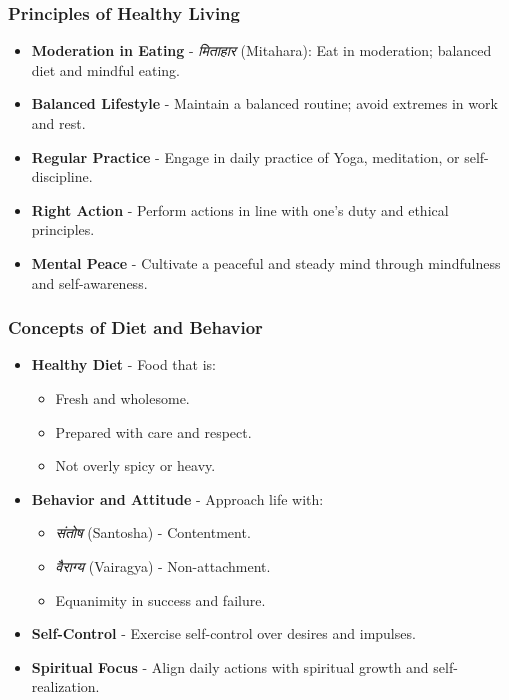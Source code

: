 \begin{frame}[fragile]\frametitle{Principles of Healthy Living}

      \begin{itemize}
		\item \textbf{Moderation in Eating} - \textit{मिताहार} (Mitahara): Eat in moderation; balanced diet and mindful eating.
		\item \textbf{Balanced Lifestyle} - Maintain a balanced routine; avoid extremes in work and rest.
		\item \textbf{Regular Practice} - Engage in daily practice of Yoga, meditation, or self-discipline.
		\item \textbf{Right Action} - Perform actions in line with one’s duty and ethical principles.
		\item \textbf{Mental Peace} - Cultivate a peaceful and steady mind through mindfulness and self-awareness.
	  \end{itemize}

\end{frame}

\begin{frame}[fragile]\frametitle{Concepts of Diet and Behavior}

      \begin{itemize}
		\item \textbf{Healthy Diet} - Food that is:
		  \begin{itemize}
		      \item Fresh and wholesome.
		      \item Prepared with care and respect.
		      \item Not overly spicy or heavy.
		  \end{itemize}
		\item \textbf{Behavior and Attitude} - Approach life with:
		  \begin{itemize}
		      \item \textit{संतोष} (Santosha) - Contentment.
		      \item \textit{वैराग्य} (Vairagya) - Non-attachment.
		      \item Equanimity in success and failure.
		  \end{itemize}
		\item \textbf{Self-Control} - Exercise self-control over desires and impulses.
		\item \textbf{Spiritual Focus} - Align daily actions with spiritual growth and self-realization.
	  \end{itemize}

\end{frame}

